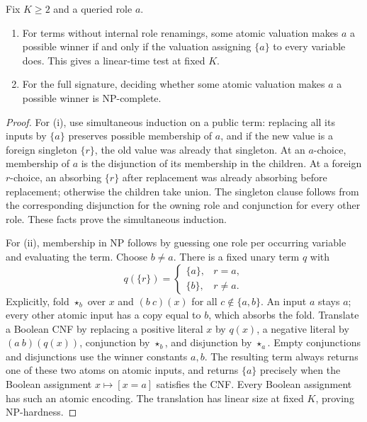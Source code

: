 \begin{theorem}
\label{olv:thm:atomic-sat}
Fix $K\geq2$ and a queried role $a$.
\begin{enumerate}[label=(\roman*)]
\item For terms without internal role renamings, some atomic valuation
makes $a$ a possible winner if and only if the valuation assigning
$\{a\}$ to every variable does. This gives a linear-time test at fixed $K$.
\item For the full signature, deciding whether some atomic valuation
makes $a$ a possible winner is NP-complete.
\end{enumerate}
\end{theorem}
\begin{proof}
For (i), use simultaneous induction on a public term: replacing all its
inputs by $\{a\}$ preserves possible membership of $a$, and if the new
value is a foreign singleton $\{r\}$, the old value was already that
singleton. At an $a$-choice, membership of $a$ is the disjunction of its
membership in the children. At a foreign $r$-choice, an absorbing
$\{r\}$ after replacement was already absorbing before replacement;
otherwise the children take union. The singleton clause follows from
the corresponding disjunction for the owning role and conjunction for
every other role. These facts prove the simultaneous induction.

For (ii), membership in NP follows by guessing one role per occurring
variable and evaluating the term. Choose $b\ne a$. There is a fixed
unary term $q$ with
\[
 q(\{r\})=\begin{cases}\{a\},&r=a,\\\{b\},&r\ne a.\end{cases}
\]
Explicitly, fold $\star_b$ over $x$ and $(b\ c)(x)$ for all
$c\notin\{a,b\}$. An input $a$ stays $a$; every other atomic input
has a copy equal to $b$, which absorbs the fold.
Translate a Boolean CNF by replacing a positive literal $x$ by $q(x)$,
a negative literal by $(a\ b)(q(x))$, conjunction by $\star_b$, and
disjunction by $\star_a$. Empty conjunctions and disjunctions use the
winner constants $a,b$. The resulting term always returns one of these
two atoms on atomic inputs, and returns $\{a\}$ precisely when the
Boolean assignment $x\mapsto[x=a]$ satisfies the CNF. Every Boolean
assignment has such an atomic encoding. The translation has linear size
at fixed $K$, proving NP-hardness.
\end{proof}

